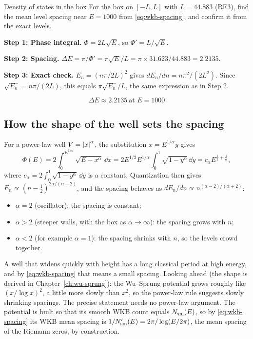 \begin{sample}{Density of states in the box}
For the box on $[-L,L]$ with $L=44.883$ (RE3), find the mean level spacing near $E=1000$ from \cref{eq:wkb-spacing}, and confirm it from the exact levels.

\textbf{Step 1: Phase integral.} $\Phi=2L\sqrt E$, so $\Phi'=L/\sqrt E$.

\textbf{Step 2: Spacing.} $\Delta E=\pi/\Phi'=\pi\sqrt E/L=\pi\times31.623/44.883=2.2135$.

\textbf{Step 3: Exact check.} $E_n=(n\pi/2L)^2$ gives $dE_n/dn=n\pi^2/(2L^2)$. Since $\sqrt{E_n}=n\pi/(2L)$, this equals $\pi\sqrt{E_n}/L$, the same expression as in Step 2.

\[
\boxed{\Delta E\approx2.2135\ \text{at }E=1000}
\]
\end{sample}

\subsection{How the shape of the well sets the spacing}

For a power-law well $V=\left\lvert x\right\rvert^\alpha$, the substitution $x=E^{1/\alpha}y$ gives
\begin{equation}
\Phi(E)=2\int_0^{E^{1/\alpha}}\sqrt{E-x^\alpha}\,\dd x=2E^{1/2}E^{1/\alpha}\int_0^1\sqrt{1-y^\alpha}\,\dd y=c_\alpha E^{\frac12+\frac1\alpha},
\end{equation}
where $c_\alpha=2\int_0^1\sqrt{1-y^\alpha}\,\dd y$ is a constant. Quantization then gives $E_n\propto(n-\frac12)^{2\alpha/(\alpha+2)}$, and the spacing behaves as $dE_n/dn\propto n^{(\alpha-2)/(\alpha+2)}$:
\begin{itemize}
\item $\alpha=2$ (oscillator): the spacing is constant;
\item $\alpha>2$ (steeper walls, with the box as $\alpha\to\infty$): the spacing grows with $n$;
\item $\alpha<2$ (for example $\alpha=1$): the spacing shrinks with $n$, so the levels crowd together.
\end{itemize}
A well that widens quickly with height has a long classical period at high energy, and by \cref{eq:wkb-spacing} that means a small spacing. Looking ahead (the shape is derived in Chapter~\ref{ch:wu-sprung}): the Wu--Sprung potential grows roughly like $(x/\log x)^2$, a little more slowly than $x^2$, so the power-law rule suggests slowly shrinking spacings. The precise statement needs no power-law argument. The potential is built so that its smooth WKB count equals $N_{\mathrm{sm}}(E)$, so by \cref{eq:wkb-spacing} its WKB mean spacing is $1/N_{\mathrm{sm}}'(E)=2\pi/\log(E/2\pi)$, the mean spacing of the Riemann zeros, by construction.

